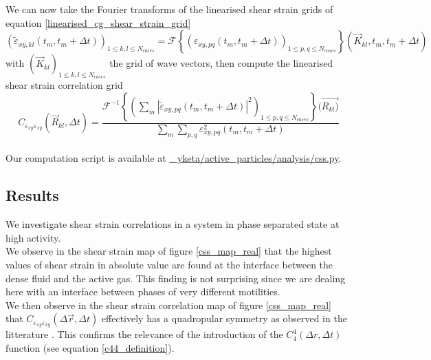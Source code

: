 \documentclass[class=report, float=false, crop=false]{standalone}
\begin{document}
We can now take the Fourier transforms of the linearised shear strain grids of equation \ref{linearised_cg_shear_strain_grid}
\begin{equation}
(\tilde{\varepsilon}_{xy,kl}(t_m, t_m + \Delta t))_{1 \leq k, l \leq N_{cases}} = \mathcal{F}\left\{(\varepsilon_{xy,pq}(t_m, t_m + \Delta t))_{1 \leq p, q \leq N_{cases}}\right\}(\vec{K}_{kl}, t_m, t_m + \Delta t)
\end{equation}
with $(\vec{K}_{kl})_{1 \leq k, l \leq N_{cases}}$ the grid of wave vectors, then compute the linearised shear strain correlation grid
\begin{equation}
C_{\varepsilon_{xy}\varepsilon_{xy}}(\vec{R}_{kl}, \Delta t) = \frac{\mathcal{F}^{-1}\left\{\left(\sum_m |\tilde{\varepsilon}_{xy,pq}(t_m, t_m + \Delta t)|^2\right)_{1 \leq p, q \leq N_{cases}}\right\}(\vec{R_{kl})}}{\sum_m\sum_{p, q} \varepsilon_{xy, pq}^2(t_m, t_m + \Delta t)}
\end{equation}
\mbox{}\\

Our computation script is available at \href{https://github.com/yketa/active_particles/blob/master/analysis/css.py}{{\faGithub~ yketa/active\_particles/analysis/css.py}}.

\subsection{Results}
\label{subsection:real_method_results}


We investigate shear strain correlations in a system in phase separated state at high activity.\\

We observe in the shear strain map of figure \ref{css_map_real} that the highest values of shear strain in absolute value are found at the interface between the dense fluid and the active gas. This finding is not surprising since we are dealing here with an interface between phases of very different motilities.\\

We then observe in the shear strain correlation map of figure \ref{css_map_real} that $C_{\varepsilon_{xy}\varepsilon_{xy}}(\Delta \vec{r}, \Delta t)$ effectively has a quadropular symmetry as observed in the litterature \cite{illing2016strain, hassani2018long}. This confirms the relevance of the introduction of the $C_4^4(\Delta r, \Delta t)$ function (see equation \ref{c44_definition}).\\
\end{document}
